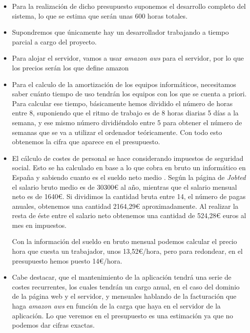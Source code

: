 \begin{itemize}
	\item Para la realización de dicho presupuesto suponemos el desarrollo completo del sistema, lo que se estima que serán unas 600 horas totales.
	\item Supondremos que únicamente hay un desarrollador trabajando a tiempo parcial a cargo del proyecto.
	\item Para alojar el servidor, vamos a usar \textit{amazon aws} para el servidor, por lo que los precios serán los que define amazon \cite{aws}
	\item Para el calculo de la amortización de los equipos informáticos, necesitamos saber cuánto tiempo de uso tendrán los equipos con los que se cuenta a priori. Para calcular ese tiempo, básicamente hemos dividido el número de horas entre 8, suponiendo que el ritmo de trabajo es de 8 horas diarias 5 días a la semana, y ese mismo número dividiéndolo entre 5 para obtener el número de semanas que se va a utilizar el ordenador teóricamente. Con todo esto obtenemos la cifra que aparece en el presupuesto.
	
	\item El cálculo de costes de personal se hace considerando impuestos de seguridad social. Esto se ha calculado en base a lo que cobra en bruto un informático en España y sabiendo cuanto es el sueldo neto medio \cite{jobted}. Según la página de \textit{Jobted} el salario bruto medio es de 30300€ al año, mientras que el salario mensual neto es de 1640€. Si dividimos la cantidad bruta entre 14, el número de pagas anuales, obtenemos una cantidad 2164,29€ aproximadamente. Al realizar la resta de éste entre el salario neto obtenemos una cantidad de 524,28€ euros al mes en impuestos. 
	
	Con la información del sueldo en bruto mensual podemos calcular el precio hora que cuesta un trabajador, unos 13,52€/hora, pero para redondear, en el presupuesto hemos puesto 14€/hora.
	
	\item Cabe destacar, que el mantenimiento de la aplicación tendrá una serie de costes recurrentes, los cuales tendrán un cargo anual, en el caso del dominio de la página web y el servidor, y mensuales hablando de la facturación que haga \textit{amazon aws} en función de la carga que haya en el servidor de la aplicación. Lo que veremos en el presupuesto es una estimación ya que no podemos dar cifras exactas.
	
\end{itemize}

